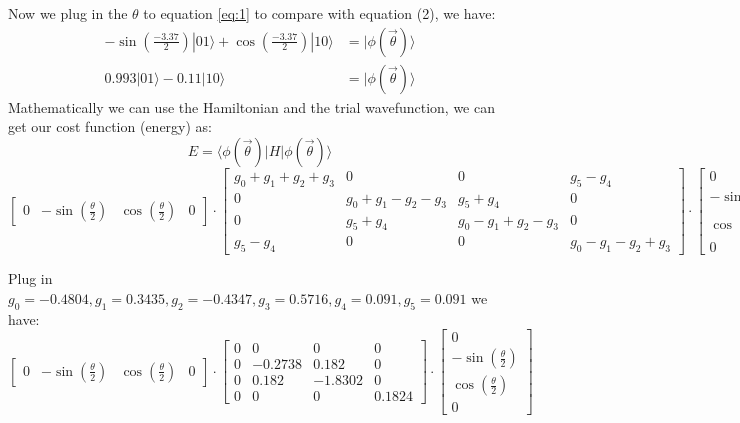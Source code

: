 \documentclass{article}
\begin{document}
\begin{itemize}
	      Now we plug in the \(\theta\) to equation \eqref{eq:1} to compare with equation (2), we have:
	      \begin{align*}
		      -\sin\left(\frac{-3.37}{2}\right) |01 \rangle + \cos\left(\frac{-3.37}{2}\right) |10 \rangle & = |\phi(\vec{\theta}) \rangle \\
		      0.993 |01\rangle  - 0.11 |10\rangle                                                          & = |\phi(\vec{\theta}) \rangle
	      \end{align*}
	      Mathematically we can use the Hamiltonian and the trial wavefunction, we can get our cost function (energy) as:
	      \[E = \langle \phi({\vec{\theta}})| H | \phi(\vec{\theta}) \rangle\]
	      \[
		      \begin{bmatrix}
			      0 & -\sin(\frac{\theta}{2}) & \cos(\frac{\theta}{2}) & 0
		      \end{bmatrix}
		      \cdot
		      \begin{bmatrix}
			      g_0 + g_1 + g_2 + g_3 & 0                     & 0                     & g_5 - g_4              \\
			      0                     & g_0 + g_1 - g_2 - g_3 & g_5 + g_4             & 0                      \\
			      0                     & g_5 + g_4             & g_0 - g_1 + g_2 - g_3 & 0                      \\
			      g_5 - g_4             & 0                     & 0                     & g_0 - g_1 - g_2 +  g_3
		      \end{bmatrix}
		      \cdot
		      \begin{bmatrix}
			      0                        \\
			      - \sin(\frac{\theta}{2}) \\
			      \cos(\frac{\theta}{2})   \\
			      0
		      \end{bmatrix}
	      \]

	      Plug in  \(g_0 = -0.4804, g_1 = 0.3435, g_2 = -0.4347, g_3 = 0.5716, g_4 = 0.091, g_5 = 0.091\) we have:
	      \[
		      \begin{bmatrix}
			      0 & -\sin(\frac{\theta}{2}) & \cos(\frac{\theta}{2}) & 0
		      \end{bmatrix}
		      \cdot
		      \begin{bmatrix}
			      0 & 0       & 0       & 0      \\
			      0 & -0.2738 & 0.182   & 0      \\
			      0 & 0.182   & -1.8302 & 0      \\
			      0 & 0       & 0       & 0.1824
		      \end{bmatrix}
		      \cdot
		      \begin{bmatrix}
			      0                        \\
			      - \sin(\frac{\theta}{2}) \\
			      \cos(\frac{\theta}{2})   \\
			      0
		      \end{bmatrix}
	      \]


\end{itemize}
\end{document}
